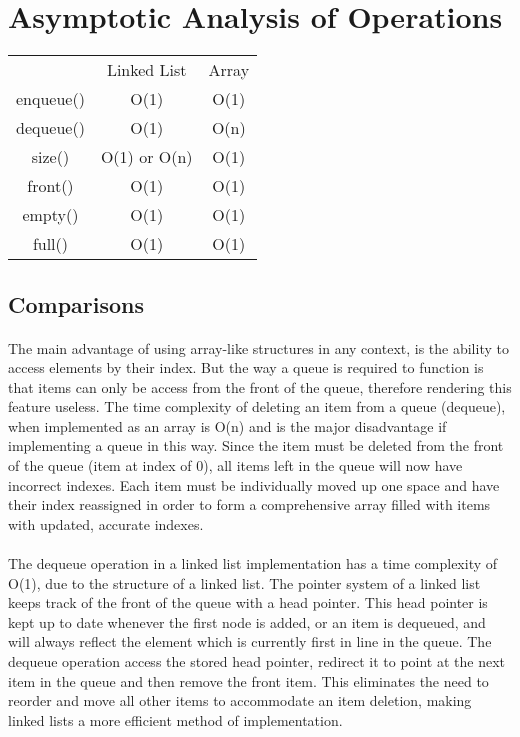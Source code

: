 \documentclass[12pt]{article}
\begin{document}
\section{Asymptotic Analysis of Operations}

\begin{center}
\begin{tabular}{ |c|c|c| } 
 \hline
  & Linked List & Array \\ 
 enqueue() & O(1) & O(1) \\ 
 dequeue() & O(1) & O(n) \\ 
 size() & O(1) or O(n) & O(1) \\ 
 front() & O(1) & O(1) \\ 
 empty() & O(1) & O(1) \\ 
 full() & O(1) & O(1) \\ 
 \hline
\end{tabular}
\end{center}

\subsection{Comparisons}

\paragraph{} The main advantage of using array-like structures in any context, is the ability to access elements by their index. But the way a queue is required to function is that items can only be access from the front of the queue, therefore rendering this feature useless. The time complexity of deleting an item from a queue (dequeue), when implemented as an array is O(n) and is the major disadvantage if implementing a queue in this way. Since the item must be deleted from the front of the queue (item at index of 0), all items left in the queue will now have incorrect indexes. Each item must be individually moved up one space and have their index reassigned in order to form a comprehensive array filled with items with updated, accurate indexes. 
\paragraph{} The dequeue operation in a linked list implementation has a time complexity of O(1), due to the structure of a linked list. The pointer system of a linked list keeps track of the front of the queue with a head pointer. This head pointer is kept up to date whenever the first node is added, or an item is dequeued, and will always reflect the element which is currently first in line in the queue. The dequeue operation access the stored head pointer, redirect it to point at the next item in the queue and then remove the front item. This eliminates the need to reorder and move all other items to accommodate an item deletion, making linked lists a more efficient method of implementation.
\end{document}
